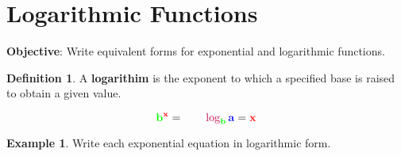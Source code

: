 \documentclass{report}
\theoremstyle{definition}
\newtheorem{example}{\bf Example}
\newtheorem{definition}{\bf Definition}[section]
\begin{document}
 \section{ Logarithmic Functions  }
  \indent\hfill\small\noindent \textbf{Objective}: Write equivalent forms for exponential and logarithmic functions. \normalsize\\
 \setcounter{example}{0}
 \setcounter{definition}{0}
 
 \begin{definition}
 A \textbf{logarithim} is the exponent to which a specified base is raised to obtain a given value.  
 \end{definition}
 
 \vspace{-0.5cm}
 
 \Large \[\mathbf{\color{green}b^{\color{red}x} \color{black}=\color{blue} \qquad  \color{purple}\log_{\color{green}b}\color{blue} a \color{black} = \color{red} x }\]\normalsize
 
 \begin{example}
Write each exponential equation in logarithmic form.
 \end{example}
	 
\end{document}

